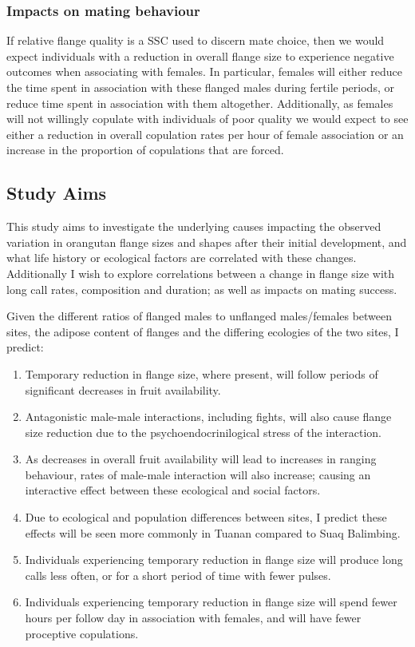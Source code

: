 \subsubsection{Impacts on mating behaviour}
If relative flange quality is a SSC used to discern mate choice, then we would expect individuals with a reduction in overall flange size to experience negative outcomes when associating with females. In particular, females will either reduce the time spent in association with these flanged males during fertile periods, or reduce time spent in association with them altogether. Additionally, as females will not willingly copulate with individuals of poor quality we would expect to see either a reduction in overall copulation rates per hour of female association or an increase in the proportion of copulations that are forced.

\subsection{Study Aims}
This study aims to investigate the underlying causes impacting the observed variation in orangutan flange sizes and shapes after their initial development, and what life history or ecological factors are correlated with these changes. Additionally I wish to explore correlations between a change in flange size with long call rates, composition and duration; as well as impacts on mating success. 

Given the different ratios of flanged males to unflanged males/females between sites, the adipose content of flanges and the differing ecologies of the two sites, I predict:

\begin{enumerate}
    \item   Temporary reduction in flange size, where present, will follow periods of significant decreases in fruit availability.
    \item Antagonistic male-male interactions, including fights, will also cause flange size reduction due to the psychoendocrinilogical stress of the interaction.
    \item As decreases in overall fruit availability will lead to increases in ranging behaviour, rates of male-male interaction will also increase; causing an interactive effect between these ecological and social factors.
    \item Due to ecological and population differences between sites, I predict these effects will be seen more commonly in Tuanan compared to Suaq Balimbing.
    \item Individuals experiencing temporary reduction in flange size will produce long calls less often, or for a short period of time with fewer pulses.
    \item Individuals experiencing temporary reduction in flange size will spend fewer hours per follow day in association with females, and will have fewer proceptive copulations.
\end{enumerate}

